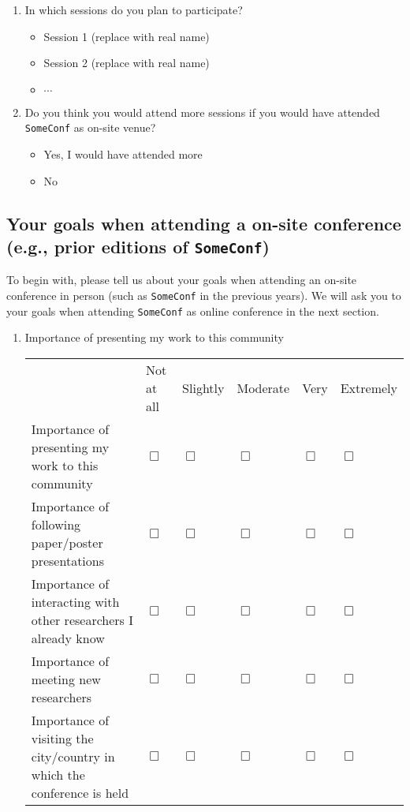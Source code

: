 \documentclass[sigconf]{acmart}
\newcommand{\confname}[0]{\texttt{SomeConf}\xspace}
\newcommand{\QO}{$\Box$}%
\newenvironment{Qlist}{%
\renewcommand{\labelitemi}{\QO}
\begin{itemize}[leftmargin=1.5em,topsep=-.5em]
}{%
\end{itemize}
}
\begin{document}
\begin{appendix}
\begin{enumerate}
	\item In which sessions do you plan to participate?
		\begin{Qlist}
			\item Session 1 (replace with real name)
			\item Session 2 (replace with real name)
			\item $\cdots$
		\end{Qlist}

	\item Do you think you would attend more sessions if you would have attended \confname as on-site venue?
		\begin{Qlist}
			\item Yes, I would have attended more
			\item No
		\end{Qlist}
\setcounter{preConfCounter}{\value{enumi}}
\end{enumerate}

\clearpage
\subsection{Your goals when attending a on-site conference (e.g., prior editions of \confname)}
To begin with, please tell us about your goals when attending an on-site conference in person (such as \confname in the previous years). We will ask you to your goals when attending \confname as online conference in the next section.

\begin{enumerate}
\setcounter{enumi}{\value{preConfCounter}}
	\item Importance of presenting my work to this community
		\begin{tabular}{p{2cm}p{.8cm}p{.9cm}p{.9cm}p{.9cm}p{.9cm}}
			& Not at all & Slightly & Moderate & Very & Extremely\\
			 
			Importance of presenting my work to this community & \QO & \QO & \QO & \QO & \QO \\
\hline
			Importance of following paper/poster presentations & \QO & \QO & \QO & \QO & \QO \\
\hline
			Importance of interacting with other researchers I already know & \QO & \QO & \QO & \QO & \QO \\
\hline
			Importance of meeting new researchers & \QO & \QO & \QO & \QO & \QO \\
\hline
			Importance of visiting the city/country in which the conference is held & \QO & \QO & \QO & \QO & \QO \\
		\end{tabular}
\setcounter{preConfCounter}{\value{enumi}}
\end{enumerate}


\end{appendix}
\end{document}
